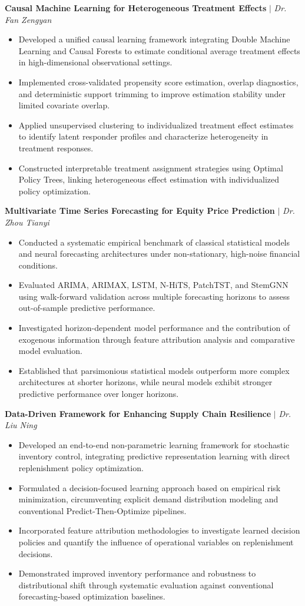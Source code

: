 \documentclass[a4paper,11pt]{article}
\newcommand{\resumeItem}[1]{
  \item\small{
    {#1 \vspace{-2pt}}
  }
}
\newcommand{\resumeProjectHeading}[1]{
      \item \small#1 \vspace{-5pt}
}
\newcommand{\resumeItemListStart}{\begin{itemize}}
\newcommand{\resumeItemListEnd}{\end{itemize}\vspace{-5pt}}
\begin{document}
\resumeProjectHeading
{\textbf{Causal Machine Learning for Heterogeneous Treatment Effects} $|$ \emph{Dr. Fan Zengyan}}
\resumeItemListStart
    \resumeItem{Developed a unified causal learning framework integrating Double Machine Learning and Causal Forests to estimate conditional average treatment effects in high-dimensional observational settings.}
    \resumeItem{Implemented cross-validated propensity score estimation, overlap diagnostics, and deterministic support trimming to improve estimation stability under limited covariate overlap.}
    \resumeItem{Applied unsupervised clustering to individualized treatment effect estimates to identify latent responder profiles and characterize heterogeneity in treatment responses.}
    \resumeItem{Constructed interpretable treatment assignment strategies using Optimal Policy Trees, linking heterogeneous effect estimation with individualized policy optimization.}
\resumeItemListEnd

\resumeProjectHeading
{\textbf{Multivariate Time Series Forecasting for Equity Price Prediction} $|$ \emph{Dr. Zhou Tianyi}}
\resumeItemListStart
    \resumeItem{Conducted a systematic empirical benchmark of classical statistical models and neural forecasting architectures under non-stationary, high-noise financial conditions.}
    \resumeItem{Evaluated ARIMA, ARIMAX, LSTM, N-HiTS, PatchTST, and StemGNN using walk-forward validation across multiple forecasting horizons to assess out-of-sample predictive performance.}
    \resumeItem{Investigated horizon-dependent model performance and the contribution of exogenous information through feature attribution analysis and comparative model evaluation.}
    \resumeItem{Established that parsimonious statistical models outperform more complex architectures at shorter horizons, while neural models exhibit stronger predictive performance over longer horizons.}
\resumeItemListEnd

\resumeProjectHeading
{\textbf{Data-Driven Framework for Enhancing Supply Chain Resilience} $|$ \emph{Dr. Liu Ning}}
\resumeItemListStart
    \resumeItem{Developed an end-to-end non-parametric learning framework for stochastic inventory control, integrating predictive representation learning with direct replenishment policy optimization.}
    \resumeItem{Formulated a decision-focused learning approach based on empirical risk minimization, circumventing explicit demand distribution modeling and conventional Predict-Then-Optimize pipelines.}
    \resumeItem{Incorporated feature attribution methodologies to investigate learned decision policies and quantify the influence of operational variables on replenishment decisions.}
    \resumeItem{Demonstrated improved inventory performance and robustness to distributional shift through systematic evaluation against conventional forecasting-based optimization baselines.}
\resumeItemListEnd
\end{document}
